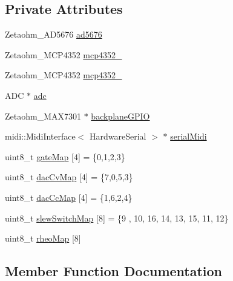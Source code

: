 \subsection*{Private Attributes}
\begin{DoxyCompactItemize}
\item 
Zetaohm\+\_\+\+A\+D5676 \hyperlink{class_output_controller_a895d5d186e2cab670a646fe061f105a3}{ad5676}
\item 
Zetaohm\+\_\+\+M\+C\+P4352 \hyperlink{class_output_controller_a5f0d06bafea4383bf411331ebf144fa9}{mcp4352\+\_}
\item 
Zetaohm\+\_\+\+M\+C\+P4352 \hyperlink{class_output_controller_a59791769507adace817d02c3d21851c2}{mcp4352\+\_}
\item 
A\+DC $\ast$ \hyperlink{class_output_controller_a9bfb0a095f159c515a688eb7883d8f2e}{adc}
\item 
Zetaohm\+\_\+\+M\+A\+X7301 $\ast$ \hyperlink{class_output_controller_ab0e2d4c6b94ea387857bd15cf8aec500}{backplane\+G\+P\+IO}
\item 
midi\+::\+Midi\+Interface$<$ Hardware\+Serial $>$ $\ast$ \hyperlink{class_output_controller_a567ff7ec4d3681767234a68440e8f244}{serial\+Midi}
\item 
uint8\+\_\+t \hyperlink{class_output_controller_a632829110f676c43b93bfe79c9698aab}{gate\+Map} \mbox{[}4\mbox{]} = \{0,1,2,3\}
\item 
uint8\+\_\+t \hyperlink{class_output_controller_a4002b7d07abca1317566052b715323da}{dac\+Cv\+Map} \mbox{[}4\mbox{]} = \{7,0,5,3\}
\item 
uint8\+\_\+t \hyperlink{class_output_controller_a87b184786d456a8e1a3312d68284c5a5}{dac\+Cc\+Map} \mbox{[}4\mbox{]} = \{1,6,2,4\}
\item 
uint8\+\_\+t \hyperlink{class_output_controller_a51c8fb4ab13bbc249e0daef8284ceb1c}{slew\+Switch\+Map} \mbox{[}8\mbox{]} = \{9 , 10, 16, 14, 13, 15, 11, 12\}
\item 
uint8\+\_\+t \hyperlink{class_output_controller_a4fed4b94c4b8869b64e57c3244289947}{rheo\+Map} \mbox{[}8\mbox{]}
\end{DoxyCompactItemize}


\subsection{Member Function Documentation}
\mbox{\label{class_output_controller_abd6a1e2af3b0e92a53f5e16292958c10}} 
